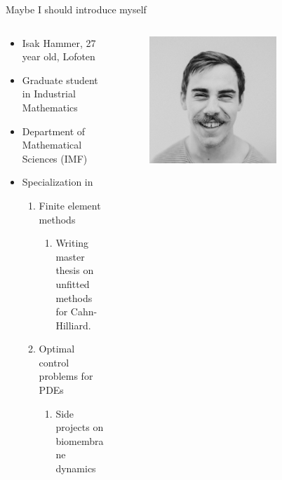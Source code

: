     \begin{frame}{Maybe I should introduce myself}
        \begin{columns}
            \begin{column}{0.5\textwidth}
                \begin{itemize}
                    \item Isak Hammer, 27 year old, Lofoten
                    \item Graduate student in Industrial Mathematics
                    \item Department of Mathematical Sciences (IMF)
                    \item Specialization in
                        \begin{enumerate}
                            \item Finite element methods
                                \begin{enumerate}
                                    \item Writing master thesis on unfitted methods for Cahn-Hilliard.
                                \end{enumerate}
                            \item Optimal control problems for PDEs
                                \begin{enumerate}
                                    \item Side projects on biomembrane dynamics
                                \end{enumerate}
                        \end{enumerate}
                \end{itemize}
            \end{column}

            \begin{column}{0.5\textwidth}
                \begin{figure}
                    \centering
                    \includegraphics[width=0.7\textwidth]{figures/isak.jpg}
                \end{figure}
            \end{column}
        \end{columns}
    \end{frame}
